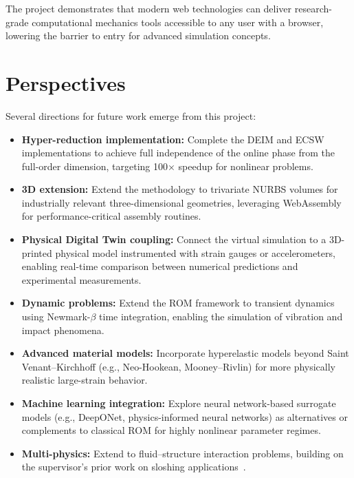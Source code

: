 The project demonstrates that modern web technologies can deliver research-grade computational mechanics tools accessible to any user with a browser, lowering the barrier to entry for advanced simulation concepts.

\section*{Perspectives}

Several directions for future work emerge from this project:

\begin{itemize}
    \item \textbf{Hyper-reduction implementation:} Complete the DEIM and ECSW implementations to achieve full independence of the online phase from the full-order dimension, targeting 100$\times$ speedup for nonlinear problems.
    
    \item \textbf{3D extension:} Extend the methodology to trivariate NURBS volumes for industrially relevant three-dimensional geometries, leveraging WebAssembly for performance-critical assembly routines.
    
    \item \textbf{Physical Digital Twin coupling:} Connect the virtual simulation to a 3D-printed physical model instrumented with strain gauges or accelerometers, enabling real-time comparison between numerical predictions and experimental measurements.
    
    \item \textbf{Dynamic problems:} Extend the ROM framework to transient dynamics using Newmark-$\beta$ time integration, enabling the simulation of vibration and impact phenomena.
    
    \item \textbf{Advanced material models:} Incorporate hyperelastic models beyond Saint Venant--Kirchhoff (e.g., Neo-Hookean, Mooney--Rivlin) for more physically realistic large-strain behavior.
    
    \item \textbf{Machine learning integration:} Explore neural network-based surrogate models (e.g., DeepONet, physics-informed neural networks) as alternatives or complements to classical ROM for highly nonlinear parameter regimes.
    
    \item \textbf{Multi-physics:} Extend to fluid--structure interaction problems, building on the supervisor's prior work on sloshing applications~\cite{hoareau2025}.
\end{itemize}
